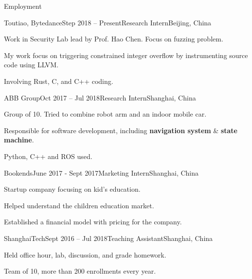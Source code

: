 \documentclass{resume} %
\begin{document}
\begin{rSection}{Employment}

\begin{rSubsection}
  {Toutiao, Bytedance}{Step 2018 – Present}{Research Intern}{Beijing, China}
    \item Work in Security Lab lead by Prof. Hao Chen. Focus on fuzzing problem.
    \item My work focus on triggering constrained integer overflow by instrumenting source code using LLVM.
    \item Involving Rust, C, and C++ coding.
\end{rSubsection}


\begin{rSubsection}
  {ABB Group}{Oct 2017 – Jul 2018}{Research Intern}{Shanghai, China}
    \item Group of 10. Tried to combine robot arm and an indoor mobile car.
    \item Responsible for software development, including \textbf{navigation system} \& \textbf{state machine}.
    \item Python, C++ and ROS used.
\end{rSubsection}


\begin{rSubsection}
  {Bookends}{June 2017 - Sept 2017}{Marketing Intern}{Shanghai, China}
    \item Startup company focusing on kid's education.
    \item Helped understand the children education market.
    \item Established a financial model with pricing for the company.
\end{rSubsection}


\begin{rSubsection}
  {ShanghaiTech}{Sept 2016 – Jul 2018}{Teaching Assistant}{Shanghai, China}
    \item Held office hour, lab, discussion, and grade homework.
    \item Team of 10, more than 200 enrollments every year.
\end{rSubsection}

\end{rSection}
\end{document}

